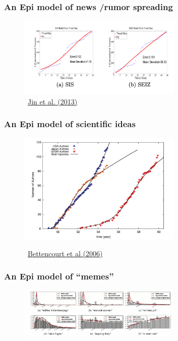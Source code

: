 \documentclass[pdflatex]{beamer}
\begin{document}
\begin{frame}
	\frametitle{An Epi model of news /rumor spreading}
\begin{figure}[!ht] \centering  %
	\caption{ ~\href{https://people.cs.vt.edu/ramakris/papers/news-rumor-epi-snakdd13.pdf}{Jin et al. (2013)}}\nocite{jin2013epidemiological}
	\label{fig:news_curve}
	\centerline{\includegraphics[width=0.7\textwidth]{./figures/Obama}}
\end{figure}
\end{frame}


\begin{frame}
	\frametitle{An Epi model of scientific ideas}
\begin{figure}[!ht] \centering  %
	\caption{ ~\href{http://web.mit.edu/dikaiser/www/BAKC.PhysA.pdf}{Bettencourt et al (2006)}}\nocite{bettencourt2006power}
	\label{fig:science_ideas_curve}
	\includegraphics[width=0.7\textwidth]{./figures/Feynman}
\end{figure}
\end{frame}


\begin{frame}
	\frametitle{An Epi model of ``memes''}
	\begin{figure}[!ht] \centering  %
		\caption{ ~\href{https://github.com/iworld1991/EpiExp/blob/master/Literature/bauckhage2011insights.pdf}{\cite{bauckhage2011insights}}}
		\label{fig:memes_curve}
		\centerline{\includegraphics[width=0.7\textwidth]{./figures/Memes}}
	\end{figure}
\end{frame}
\end{document}
